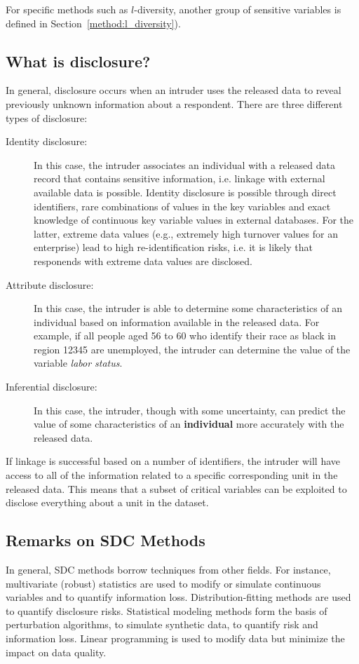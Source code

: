 \documentclass[12pt]{scrartcl}\usepackage[]{graphicx}\usepackage[]{color}
\begin{document}
For specific methods such as $l$-diversity, another group of sensitive variables is defined in Section~\ref{method:l_diversity}).

\subsection{What is disclosure?}
In general, disclosure occurs when an intruder uses the released data to reveal previously unknown information about a respondent. There are three different types of disclosure:

\begin{description}
\item[Identity disclosure:] In this case, the intruder associates an individual with a released data record that contains sensitive information, i.e. linkage with external available data is possible. Identity disclosure is possible through direct identifiers, rare combinations of values in the key variables and exact knowledge of continuous key variable values in external databases. For the latter, extreme data values (e.g., extremely high turnover values for an enterprise) lead to high re-identification risks, i.e. it is likely that responends with extreme data values are disclosed.
\item[Attribute disclosure:] In this case, the intruder is able to determine some characteristics of an individual based on information available in the released data. For example, if all people aged 56 to 60 who identify their race as black in region 12345 are unemployed, the intruder can determine the value of the variable \textit{labor status}.
\item[Inferential disclosure:] In this case, the intruder, though with some uncertainty, can predict the value of some characteristics of an \textbf{individual} more accurately with the released data.
\end{description}

If linkage is successful based on a number of identifiers, the intruder will have access to all of the information related to a specific corresponding unit in the released data. This means that a subset of critical variables can be exploited to disclose everything about a unit in the dataset.


\subsection{Remarks on SDC Methods}
In general, SDC methods borrow techniques from other fields. For instance, multivariate (robust) statistics are used to modify or simulate continuous variables and to quantify information loss. Distribution-fitting methods are used to quantify disclosure risks. Statistical modeling methods form the basis of perturbation algorithms, to simulate synthetic data, to quantify risk and information loss. Linear programming is used to modify data but minimize the impact on data quality.
\end{document}
